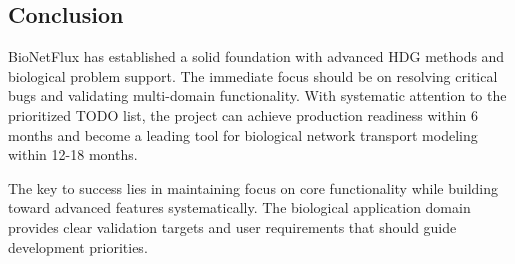 \subsection{Conclusion}

BioNetFlux has established a solid foundation with advanced HDG methods and biological problem support. The immediate focus should be on resolving critical bugs and validating multi-domain functionality. With systematic attention to the prioritized TODO list, the project can achieve production readiness within 6 months and become a leading tool for biological network transport modeling within 12-18 months.

The key to success lies in maintaining focus on core functionality while building toward advanced features systematically. The biological application domain provides clear validation targets and user requirements that should guide development priorities.

